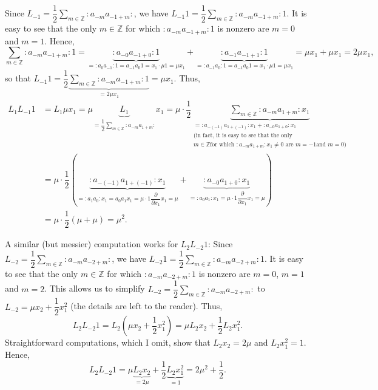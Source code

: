 \documentclass
[numbers=enddot,12pt,final,onecolumn,german,notitlepage]{scrartcl}%
\theoremstyle{definition}
\begin{document}
Since $L_{-1}=\dfrac{1}{2}\sum\limits_{m\in\mathbb{Z}}\left.  :a_{-m}%
a_{-1+m}:\right.  $, we have $L_{-1}1=\dfrac{1}{2}\sum\limits_{m\in\mathbb{Z}%
}\left.  :a_{-m}a_{-1+m}:\right.  1$. It is easy to see that the only
$m\in\mathbb{Z}$ for which $\left.  :a_{-m}a_{-1+m}:\right.  1$ is nonzero are
$m=0$ and $m=1$. Hence,
\[
\sum\limits_{m\in\mathbb{Z}}\left.  :a_{-m}a_{-1+m}:\right.
1=\underbrace{\left.  :a_{-0}a_{-1+0}:\right.  1}_{=\left.  :a_{0}%
a_{-1}:\right.  1=a_{-1}a_{0}1=x_{1}\cdot\mu1=\mu x_{1}}+\underbrace{\left.
:a_{-1}a_{-1+1}:\right.  1}_{=\left.  :a_{-1}a_{0}:\right.  1=a_{-1}%
a_{0}1=x_{1}\cdot\mu1=\mu x_{1}}=\mu x_{1}+\mu x_{1}=2\mu x_{1},
\]
so that $L_{-1}1=\dfrac{1}{2}\underbrace{\sum\limits_{m\in\mathbb{Z}}\left.
:a_{-m}a_{-1+m}:\right.  1}_{=2\mu x_{1}}=\mu x_{1}$. Thus,%
\begin{align*}
L_{1}L_{-1}1  &  =L_{1}\mu x_{1}=\mu\underbrace{L_{1}}_{=\dfrac{1}{2}%
\sum\limits_{m\in\mathbb{Z}}\left.  :a_{-m}a_{1+m}:\right.  }x_{1}=\mu
\cdot\dfrac{1}{2}\underbrace{\sum\limits_{m\in\mathbb{Z}}\left.
:a_{-m}a_{1+m}:\right.  x_{1}}_{\substack{=\left.  :a_{-\left(  -1\right)
}a_{1+\left(  -1\right)  }:\right.  x_{1}+\left.  :a_{-0}a_{1+0}:\right.
x_{1}\\\text{(in fact, it is easy to see that the only}\\m\in\mathbb{Z}\text{
for which }\left.  :a_{-m}a_{1+m}:\right.  x_{1}\neq0\text{ are }m=-1\text{
and }m=0\text{)}}}\\
&  =\mu\cdot\dfrac{1}{2}\left(  \underbrace{\left.  :a_{-\left(  -1\right)
}a_{1+\left(  -1\right)  }:\right.  x_{1}}_{=\left.  :a_{1}a_{0}:\right.
x_{1}=a_{0}a_{1}x_{1}=\mu\cdot1\dfrac{\partial}{\partial x_{1}}x_{1}=\mu
}+\underbrace{\left.  :a_{-0}a_{1+0}:\right.  x_{1}}_{=\left.  :a_{0}%
a_{1}:\right.  x_{1}=\mu\cdot1\dfrac{\partial}{\partial x_{1}}x_{1}=\mu
}\right) \\
&  =\mu\cdot\dfrac{1}{2}\left(  \mu+\mu\right)  =\mu^{2}.
\end{align*}


A similar (but messier) computation works for $L_{2}L_{-2}1$: Since
$L_{-2}=\dfrac{1}{2}\sum\limits_{m\in\mathbb{Z}}\left.  :a_{-m}a_{-2+m}%
:\right.  $, we have $L_{-2}1=\dfrac{1}{2}\sum\limits_{m\in\mathbb{Z}}\left.
:a_{-m}a_{-2+m}:\right.  1$. It is easy to see that the only $m\in\mathbb{Z}$
for which $\left.  :a_{-m}a_{-2+m}:\right.  1$ is nonzero are $m=0$, $m=1$ and
$m=2$. This allows us to simplify $L_{-2}=\dfrac{1}{2}\sum\limits_{m\in
\mathbb{Z}}\left.  :a_{-m}a_{-2+m}:\right.  $ to $L_{-2}=\mu x_{2}+\dfrac
{1}{2}x_{1}^{2}$ (the details are left to the reader). Thus,%
\[
L_{2}L_{-2}1=L_{2}\left(  \mu x_{2}+\dfrac{1}{2}x_{1}^{2}\right)  =\mu
L_{2}x_{2}+\dfrac{1}{2}L_{2}x_{1}^{2}.
\]
Straightforward computations, which I omit, show that $L_{2}x_{2}=2\mu$ and
$L_{2}x_{1}^{2}=1$. Hence,%
\[
L_{2}L_{-2}1=\mu\underbrace{L_{2}x_{2}}_{=2\mu}+\dfrac{1}{2}\underbrace{L_{2}%
x_{1}^{2}}_{=1}=2\mu^{2}+\dfrac{1}{2}.
\]
\end{document}
